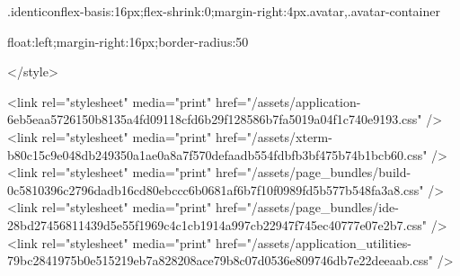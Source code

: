 {.identicon{flex-basis:16px;flex-shrink:0;margin-right:4px}.avatar,.avatar-container{float:left;margin-right:16px;border-radius:50%

</style>

<link rel="stylesheet" media="print" href="/assets/application-6eb5eaa5726150b8135a4fd09118cfd6b29f128586b7fa5019a04f1c740e9193.css" />
<link rel="stylesheet" media="print" href="/assets/xterm-b80c15c9e048db249350a1ae0a8a7f570defaadb554fdbfb3bf475b74b1bcb60.css" /><link rel="stylesheet" media="print" href="/assets/page_bundles/build-0c5810396c2796dadb16cd80ebccc6b0681af6b7f10f0989fd5b577b548fa3a8.css" /><link rel="stylesheet" media="print" href="/assets/page_bundles/ide-28bd27456811439d5e55f1969c4c1cb1914a997cb22947f745ec40777e07e2b7.css" />
<link rel="stylesheet" media="print" href="/assets/application_utilities-79bc2841975b0e515219eb7a828208ace79b8c07d0536e809746db7e22deeaab.css" />


}}
